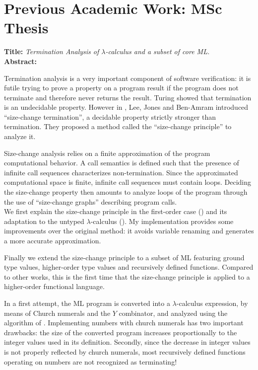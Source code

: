 \documentclass{article}
\begin{document}
\section*{Previous Academic Work: MSc Thesis}

\textbf{Title:}
\textsl{Termination Analysis of $\lambda$-calculus and a subset of core ML.}
\\

\noindent
\textbf{Abstract:}

Termination analysis is a very important component of software
verification: it is futile trying to prove a property on a program
result if the program does not terminate and therefore never returns
the result. Turing showed that termination is an undecidable
property. However in \cite{jones01}, Lee, Jones and Ben-Amram
introduced ``size-change termination'', a decidable property
strictly stronger than termination. They proposed a method called
the ``size-change principle'' to analyze it.

\noindent Size-change analysis relies on a finite approximation of
the program computational behavior. A call semantics is defined such
that the presence of infinite call sequences characterizes
non-termination. Since the approximated computational space is
finite, infinite call sequences must contain loops. Deciding the
size-change property then amounts to analyze loops of the program
through the use of ``size-change graphs'' describing program calls.
\\

\noindent We first explain the size-change principle in the
first-order case (\cite{jones01}) and its adaptation to the untyped
$\lambda$-calculus (\cite{jones04}). My implementation provides some
improvements over the original method: it avoids variable renaming
and generates a more accurate approximation.

\noindent Finally we extend the size-change principle to a subset of
ML featuring ground type values, higher-order type values and
recursively defined functions. Compared to other works, this is the
first time that the size-change principle is applied to a
higher-order functional language.

\noindent In a first attempt, the ML program is converted into a
$\lambda$-calculus expression, by means of Church numerals and the
$Y$ combinator, and analyzed using the algorithm of \cite{jones04}.
Implementing numbers with church numerals has two important
drawbacks: the size of the converted program increases
proportionally to the integer values used in its definition.
Secondly, since the decrease in integer values is not properly
reflected by church numerals, most recursively defined functions
operating on numbers are not recognized as terminating!
\end{document}
